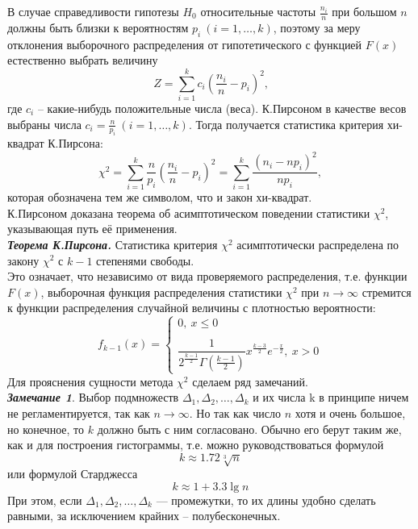 \documentclass[main.tex]{subfiles}
\begin{document}
В случае справедливости гипотезы $H_0$ относительные частоты $\frac{n_i}{n}$ при большом $n$ должны быть близки к вероятностям $p_i \ (i = 1, \dots, k)$, поэтому за меру отклонения выборочного распределения от гипотетического с функцией $F(x)$ естественно выбрать величину
\begin{equation}
	Z = \sum_{i=1}^{k} c_i (\frac{n_i}{n} - p_i)^2 \text{,}
\end{equation}
где $c_i$ -- какие-нибудь положительные числа (веса). К.Пирсоном в качестве весов выбраны числа $c_i = \frac{n}{p_i} \ (i = 1, \dots, k)$. Тогда получается статистика критерия хи-квадрат К.Пирсона:
\begin{equation} \label{eq:chi_2}
	\chi^2 = \sum_{i=1}^{k} \frac{n}{p_i} (\frac{n_i}{n} - p_i)^2 = \sum_{i=1}^{k} \frac{(n_i - n p_i)^2}{n p_i},
\end{equation}
которая обозначена тем же символом, что и закон хи-квадрат. \\
К.Пирсоном доказана теорема об асимптотическом поведении статистики $\chi^2$, указывающая путь её применения. \\
\textbf{\emph{Теорема К.Пирсона.}} Статистика критерия $\chi^2$ асимптотически распределена по закону $\chi^2$ с $k - 1$ степенями свободы. \\
Это означает, что независимо от вида проверяемого распределения, т.е. функции $F(x)$, выборочная функция распределения статистики $\chi^2$ при $n \rightarrow \infty$ стремится к функции распределения случайной величины с плотностью вероятности:
\begin{equation}
	f_{k-1}(x) =
	\begin{cases}
		0, \ x \leq 0 \\ \\
		\dfrac{1}{2^{\frac{k - 1}{2}} \Gamma (\frac{k - 1}{2})} x^{\frac{k - 3}{2}} e^{-\frac{x}{2}}, \ x > 0
	\end{cases}
\end{equation}
Для прояснения сущности метода $\chi^2$ сделаем ряд замечаний. \\

\textbf{\textit{Замечание 1}}. Выбор подмножеств $\Delta_{1},\Delta_{2}, \dots, \Delta_{k}$ и их числа k в принципе ничем не регламентируется, так как $n \rightarrow \infty$. Но так как число $n$ хотя и очень большое, но конечное, то $k$ должно быть с ним согласовано. Обычно его берут таким же, как и для построения гистограммы, т.е. можно руководствоваться формулой
\begin{equation}
	k \approx 1.72\sqrt[3]{n}
	\label{eq:k_1}
\end{equation}
или формулой Старджесса
\begin{equation}
	k \approx 1 + 3.3 \lg n
\end{equation}
При этом, если  $\Delta_{1},\Delta_{2}, \dots ,\Delta_{k}$ — промежутки, то их длины удобно сделать равными, за исключением крайних -- полубесконечных.
\end{document}
